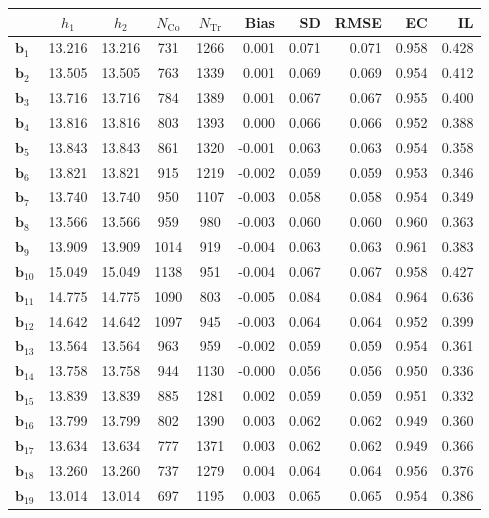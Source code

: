 \documentclass[10pt]{article}
\newcommand{\bb}{\mathbf{b}}
\begin{document}
\begin{table}[p]
    \centering
\begin{tabular}{lccccrrrrr}
\toprule\toprule
 & $h_1$ & $h_2$ & $N_{\mathrm{Co}}$ & $N_{\mathrm{Tr}}$ & Bias & SD & RMSE & EC & IL \\
\midrule
$\bb_{1}$ & 13.216 & 13.216 & 731 & 1266 & 0.001 & 0.071 & 0.071 & 0.958 & 0.428 \\
$\bb_{2}$ & 13.505 & 13.505 & 763 & 1339 & 0.001 & 0.069 & 0.069 & 0.954 & 0.412 \\
$\bb_{3}$ & 13.716 & 13.716 & 784 & 1389 & 0.001 & 0.067 & 0.067 & 0.955 & 0.400 \\
$\bb_{4}$ & 13.816 & 13.816 & 803 & 1393 & 0.000 & 0.066 & 0.066 & 0.952 & 0.388 \\
$\bb_{5}$ & 13.843 & 13.843 & 861 & 1320 & -0.001 & 0.063 & 0.063 & 0.954 & 0.358 \\
$\bb_{6}$ & 13.821 & 13.821 & 915 & 1219 & -0.002 & 0.059 & 0.059 & 0.953 & 0.346 \\
$\bb_{7}$ & 13.740 & 13.740 & 950 & 1107 & -0.003 & 0.058 & 0.058 & 0.954 & 0.349 \\
$\bb_{8}$ & 13.566 & 13.566 & 959 & 980 & -0.003 & 0.060 & 0.060 & 0.960 & 0.363 \\
$\bb_{9}$ & 13.909 & 13.909 & 1014 & 919 & -0.004 & 0.063 & 0.063 & 0.961 & 0.383 \\
$\bb_{10}$ & 15.049 & 15.049 & 1138 & 951 & -0.004 & 0.067 & 0.067 & 0.958 & 0.427 \\
$\bb_{11}$ & 14.775 & 14.775 & 1090 & 803 & -0.005 & 0.084 & 0.084 & 0.964 & 0.636 \\
$\bb_{12}$ & 14.642 & 14.642 & 1097 & 945 & -0.003 & 0.064 & 0.064 & 0.952 & 0.399 \\
$\bb_{13}$ & 13.564 & 13.564 & 963 & 959 & -0.002 & 0.059 & 0.059 & 0.954 & 0.361 \\
$\bb_{14}$ & 13.758 & 13.758 & 944 & 1130 & -0.000 & 0.056 & 0.056 & 0.950 & 0.336 \\
$\bb_{15}$ & 13.839 & 13.839 & 885 & 1281 & 0.002 & 0.059 & 0.059 & 0.951 & 0.332 \\
$\bb_{16}$ & 13.799 & 13.799 & 802 & 1390 & 0.003 & 0.062 & 0.062 & 0.949 & 0.360 \\
$\bb_{17}$ & 13.634 & 13.634 & 777 & 1371 & 0.003 & 0.062 & 0.062 & 0.949 & 0.366 \\
$\bb_{18}$ & 13.260 & 13.260 & 737 & 1279 & 0.004 & 0.064 & 0.064 & 0.956 & 0.376 \\
$\bb_{19}$ & 13.014 & 13.014 & 697 & 1195 & 0.003 & 0.065 & 0.065 & 0.954 & 0.386 \\

\end{tabular}
\end{table}
\end{document}
